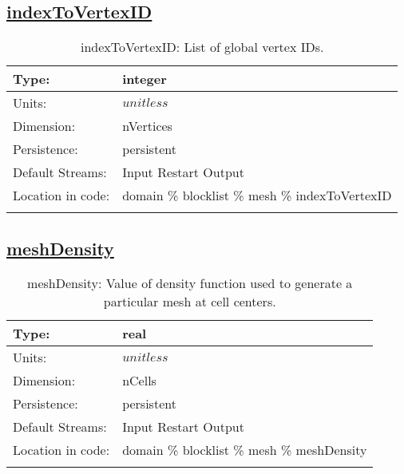 \subsection[indexToVertexID]{\hyperref[sec:var_tab_mesh]{indexToVertexID}}
\label{subsec:var_sec_mesh_indexToVertexID}
\begin{center}
\begin{longtable}{| p{2.0in} | p{4.0in} |}
        \hline 
        Type: & integer \\
        \hline 
        Units: & $unitless$ \\
        \hline 
        Dimension: & nVertices \\
        \hline 
        Persistence: & persistent \\
        \hline 
		 Default Streams: & Input Restart Output  \\
        \hline 
		 Location in code: & domain \% blocklist \% mesh \% indexToVertexID \\
		 \hline 
    \caption{indexToVertexID: List of global vertex IDs.}
\end{longtable}
\end{center}
\subsection[meshDensity]{\hyperref[sec:var_tab_mesh]{meshDensity}}
\label{subsec:var_sec_mesh_meshDensity}
\begin{center}
\begin{longtable}{| p{2.0in} | p{4.0in} |}
        \hline 
        Type: & real \\
        \hline 
        Units: & $unitless$ \\
        \hline 
        Dimension: & nCells \\
        \hline 
        Persistence: & persistent \\
        \hline 
		 Default Streams: & Input Restart Output  \\
        \hline 
		 Location in code: & domain \% blocklist \% mesh \% meshDensity \\
		 \hline 
    \caption{meshDensity: Value of density function used to generate a particular mesh at cell centers.}
\end{longtable}
\end{center}
